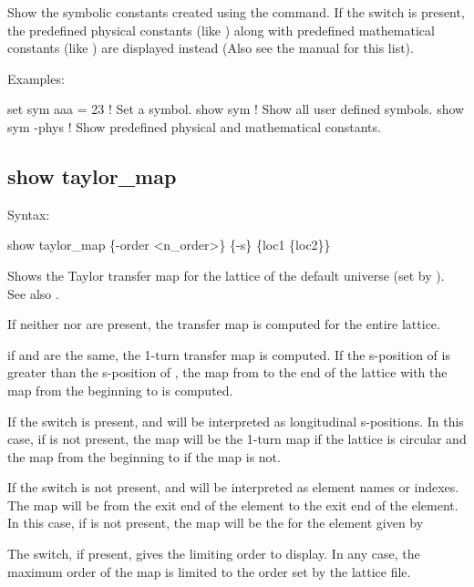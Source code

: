 {{{{{{Show the symbolic constants created using the  command. If the
 switch is present, the predefined physical constants (like )
along with predefined mathematical constants (like ) are displayed instead (Also see the \bmad
manual for this list). 

Examples:
\begin{example}
  set sym aaa = 23  ! Set a symbol.
  show sym          ! Show all user defined symbols.
  show sym -phys    ! Show predefined physical and mathematical constants.
\end{example}


\subsection{show taylor_map}
\label{s:show.taylor}

Syntax:
\begin{example}
  show taylor_map \{-order <n_order>\} \{-s\} \{loc1 \{loc2\}\}
\end{example}

Shows the Taylor transfer map for the  lattice of the default universe (set by
).  See also .

If neither  nor  are present, the transfer map is computed for the
entire lattice.

if  and  are the same, the 1-turn transfer map is computed. If the
s-position of  is greater than the s-position of , the map from
 to the end of the lattice with the map from the beginning to  is
computed.

If the  switch is present,  and  will be interpreted as
longitudinal s-positions. In this case, if  is not present, the map will be the
1-turn map if the lattice is circular and the map from the beginning to  if the
map is not.

If the  switch is not present,  and  will be interpreted as
element names or indexes. The map will be from the exit end of the  element to
the exit end of the  element. In this case, if  is not present, the map
will be the for the element given by 

The  switch, if present, gives the limiting order to display. In any case, the
maximum order of the map is limited to the order set by the lattice file.

}}}}}}
